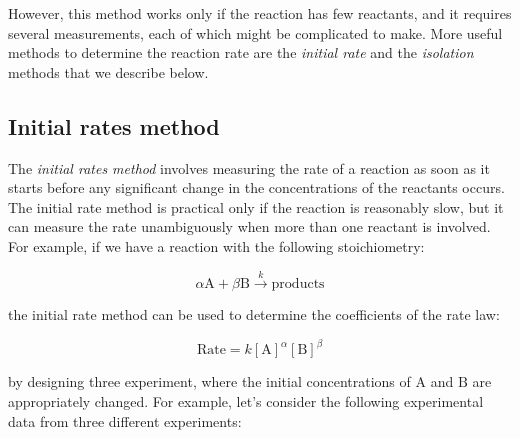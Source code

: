 \documentclass[
  9pt,
]{extbook}
\theoremstyle{definition}
\theoremstyle{definition}
\theoremstyle{definition}
\theoremstyle{remark}
\begin{document}
\normalsize

However, this method works only if the reaction has few reactants, and it requires several measurements, each of which might be complicated to make. More useful methods to determine the reaction rate are the \emph{initial rate} and the \emph{isolation} methods that we describe below.

\hypertarget{initial-rates-method}{%
\subsection{Initial rates method}\label{initial-rates-method}}

The \emph{initial rates method} involves measuring the rate of a reaction as soon as it starts before any significant change in the concentrations of the reactants occurs. The initial rate method is practical only if the reaction is reasonably slow, but it can measure the rate unambiguously when more than one reactant is involved. For example, if we have a reaction with the following stoichiometry:

\begin{equation}
\alpha \mathrm{A} + \beta \mathrm{B} \xrightarrow{k} \text{products}
\end{equation}

the initial rate method can be used to determine the coefficients of the rate law:

\begin{equation}
\text{Rate}=k[\mathrm{A}]^{\alpha}[\mathrm{B}]^{\beta}
\label{eq:kinini1}
\end{equation}

by designing three experiment, where the initial concentrations of \(\mathrm{A}\) and \(\mathrm{B}\) are appropriately changed. For example, let's consider the following experimental data from three different experiments:
\end{document}
